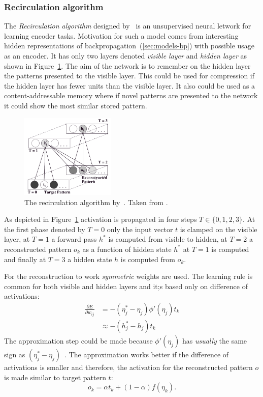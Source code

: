 \subsubsection{Recirculation algorithm}
\label{sec:models-recirc} 

The \emph{Recirculation algorithm} designed by~\citet{hinton1988learning} is an unsupervised neural letwork for learning encoder tasks. Motivation for such a model comes from interesting hidden representations of backpropagation~(\ref{sec:models-bp}) with possible usage as an encoder. It has only two layers denoted \emph{visible layer} and \emph{hidden layer} as shown in Figure~\ref{fig:models-recirc}. The aim of the network is to remember on the hidden layer the patterns presented to the visible layer. This could be used for compression if the hidden layer has fewer units than the visible layer. It also could be used as a content-addressable memory where if novel patterns are presented to the network it could show the most similar stored pattern. 

\begin{figure}[H]
  \centering
\includegraphics[width=0.4\textwidth]{img/recirculation.png}
  \caption{The recirculation algorithm by~\citet{hinton1988learning}. Taken from \citep{o1996bio}.}
  \label{fig:models-recirc}
\end{figure}

As depicted in Figure~\ref{fig:models-recirc} activation is propagated in four steps $T \in \{0,1,2,3\}$. At the first phase denoted by $T=0$ only the input vector $t$ is clamped on the visible layer, at $T=1$ a forward pass $h^{*}$ is computed from visible to hidden, at $T=2$ a reconstructed pattern $o_k$ as a function of hidden state $h^{*}$ at $T=1$ is computed and finally at $T=3$ a hidden state $h$ is computed from $o_k$.

For the reconstruction to work \emph{symmetric} weights are used. The learning rule is common for both visible and hidden layers and it;s based only on difference of activations: 
\begin{align}
\frac{\partial E}{\partial w_{ij}} &= -(\eta^{*}_j - \eta_j) \phi'(\eta_j) t_k \nonumber \\
&\approx -(h^{*}_j - h_j)t_k \nonumber 
\end{align} 
The approximation step could be made because $\phi'(\eta_j)$ has \emph{usually} the same sign as $(\eta^{*}_j - \eta_j) $~\citep{hinton1988learning, o1996bio}. The approximation works better if the difference of activations is smaller and therefore, the activation for the reconstructed pattern $o$  is made similar to target pattern $t$: 
\begin{equation}
o_k = \alpha t_k + (1-\alpha)f(\eta_k). 
\end{equation} 

